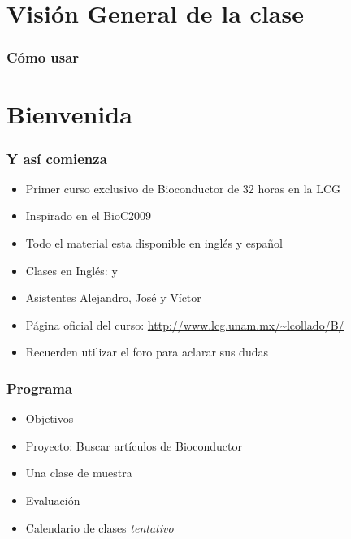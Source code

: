 




\usepackage{Sweave}


\begin{frame}[allowframebreaks]
  \titlepage
\end{frame}

\section*{Visi\'on General de la clase}

\begin{frame}[allowframebreaks]
  \frametitle{Cómo usar }
  \tableofcontents[hideallsubsections]
\end{frame}

\section{Bienvenida}

\begin{frame}[allowframebreaks]
  \frametitle{Y as\'i comienza}
  \begin{itemize}
  \item Primer curso exclusivo de Bioconductor de 32 horas en la LCG
  \item Inspirado en el BioC2009
  \item Todo el material esta disponible en ingl\'es y español
  \item Clases en Ingl\'es:  y 
  \item Asistentes Alejandro, Jos\'e y V\'ictor
  \item P\'agina oficial del curso: \url{http://www.lcg.unam.mx/~lcollado/B/}
  \item Recuerden utilizar el foro para aclarar sus dudas
  \end{itemize}
\end{frame}

\begin{frame}[allowframebreaks]
  \frametitle{Programa}
  \begin{itemize}
  \item Objetivos
  \item Proyecto: Buscar artículos de Bioconductor
  \item Una clase de muestra
  \item Evaluaci\'on
  \item Calendario de clases \emph{tentativo}
  \end{itemize}
\end{frame}

